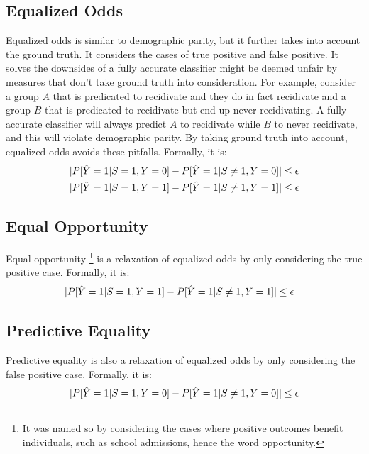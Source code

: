 \documentclass[conference]{IEEEtran}
\begin{document}
\subsection{Equalized Odds}
Equalized odds \cite{hardt2016equality} is similar to demographic parity, but it further takes into account the ground truth. It considers the cases of true positive and false positive. It solves the downsides of a fully accurate classifier might be deemed unfair by measures that don't take ground truth into consideration. For example, consider a group $A$ that is predicated to recidivate and they do in fact recidivate and a group $B$ that is predicated to recidivate but end up never recidivating. A fully accurate classifier will always predict $A$ to recidivate while $B$ to never recidivate, and this will violate demographic parity. By taking ground truth into account, equalized odds avoids these pitfalls. Formally, it is:
\begin{align*}
    \lvert P[\hat{Y} = 1 | S = 1, Y = 0] - P[\hat{Y} = 1 | S \neq 1, Y = 0]\rvert & \leq \epsilon \\
    \lvert P[\hat{Y} = 1 | S = 1, Y = 1] - P[\hat{Y} = 1 | S \neq 1, Y = 1]\rvert & \leq \epsilon
\end{align*}

\subsection{Equal Opportunity}
Equal opportunity \footnote{It was named so by considering the cases where positive outcomes benefit individuals, such as school admissions, hence the word opportunity.} \cite{hardt2016equality} is a relaxation of equalized odds by only considering the true positive case. Formally, it is:
\begin{align*}
    \lvert P[\hat{Y} = 1 | S = 1, Y = 1] - P[\hat{Y} = 1 | S \neq 1, Y = 1]\rvert & \leq \epsilon
\end{align*}

\subsection{Predictive Equality}
Predictive equality \cite{corbett2017algorithmic} is also a relaxation of equalized odds by only considering the false positive case. Formally, it is:
\begin{align*}
    \lvert P[\hat{Y} = 1 | S = 1, Y = 0] - P[\hat{Y} = 1 | S \neq 1, Y = 0]\rvert \leq \epsilon
\end{align*}
\end{document}

